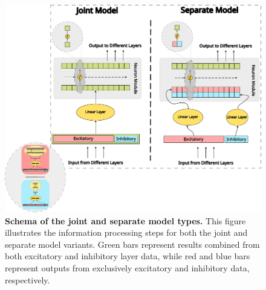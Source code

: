 \begin{figure}
    \centering
    \includegraphics[width=\linewidth]{img/joint_separate_schema.pdf}
    \caption{\textbf{Schema of the joint and separate model types.} This figure illustrates the information processing steps for both the joint and separate model variants. Green bars represent results combined from both excitatory and inhibitory layer data, while red and blue bars represent outputs from exclusively excitatory and inhibitory data, respectively.}
    \label{fig:joint_sep_modules}
\end{figure}

